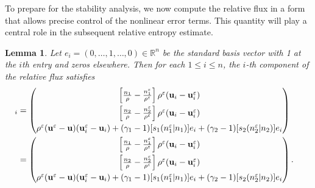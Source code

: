 \documentclass[10pt,reqno]{amsart}
\numberwithin{equation}{section}
\newtheorem{lemma}{Lemma}[section]
\newcommand{\R}{\mathbb R}
\newcommand{\e}{\varepsilon}
\newcommand{\ve}{\varepsilon}
\begin{document}
To prepare for the stability analysis, we now compute the relative flux in a form that allows precise control of the nonlinear error terms. This quantity will play a central role in the subsequent relative entropy estimate.
\begin{lemma}
    Let $e_i = (0,\ldots, 1,\ldots, 0)\in \R^n$ be the standard basis vector with 1 at the $i$th entry and zeros elsewhere. Then for each $1 \le i \le n$, the $i$-th component of the relative flux satisfies
        \begin{align*}
         [A(U^\ve|U)]_i  &= \begin{pmatrix}
            \left[\frac{n_1}{\rho} - \frac{n_1^\ve}{\rho^\ve } \right] \rho^\ve  ({\bf{u}}_i -{\bf{u}}_i^\ve) \\[6pt]
            \left[\frac{n_2}{\rho} - \frac{n_2^\ve}{\rho^\ve} \right] \rho^\ve  ({\bf{u}}_i-{\bf{u}}_i^\ve) \\[6pt]
            \rho^\ve({\bf{u}}^\ve-{\bf{u}})({\bf{u}}_i^\ve - {\bf{u}}_i) + (\gamma_1-1)[s_1(n_1^\ve|n_1)]e_i + (\gamma_2-1)[s_2(n_2^\ve|n_2)]e_i
        \end{pmatrix} \cr
        &= \begin{pmatrix}
            \left[\frac{n_1}{\rho} - \frac{n_1^\ve}{\rho^\e} \right]  \rho^\e  ({\bf{u}}_i -{\bf{u}}_i^\ve) \\[6pt]
            \left[\frac{n_2}{\rho} - \frac{n_2^\ve}{\rho^\ve} \right]  \rho^\ve  ({\bf{u}}_i-{\bf{u}}_i^\ve) \\[6pt]
             \rho^\ve ({\bf{u}}^\ve-{\bf{u}})({\bf{u}}_i^\ve - {\bf{u}}_i) + (\gamma_1-1)[s_1(n_1^\ve|n_1)]e_i + (\gamma_2-1)[s_2(n_2^\ve|n_2)]e_i
        \end{pmatrix}.
    \end{align*}
\end{lemma}
\end{document}
